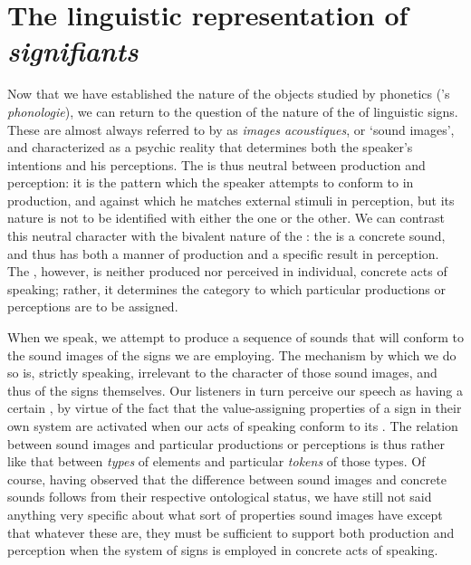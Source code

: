 \section{The linguistic representation of \textit{signifiants}}

Now that we have established the nature of the objects studied by
phonetics ({\Saussure}'s \emph{phonologie}), we can return to the
question of the nature of the \emph{} of linguistic
signs. These are almost always referred to by {\Saussure} as \emph{images
  acoustiques}, or `sound images', and characterized as a psychic
reality that determines both the speaker's intentions and his
perceptions. The  is thus neutral between production and
perception: it is the pattern which the speaker attempts to conform to
in production, and against which he matches external stimuli in
perception, but its nature is not to be identified with either the one
or the other. We can {contrast} this neutral character with the bivalent
nature of the : the  is a concrete sound, and thus has
both a manner of production and a specific result in perception. The
, however, is neither produced nor perceived in individual,
concrete acts of speaking; rather, it determines the category to which
particular productions or perceptions are to be assigned.

When we speak, we attempt to produce a sequence of sounds that will
conform to the sound images of the signs we are employing. The
{mechanism} by which we do so is, strictly speaking, irrelevant to the
character of those sound images, and thus of the signs themselves. Our
listeners in turn perceive our speech as having a certain , by
virtue of the fact that the value-assigning properties of a sign in
their own system are activated when our acts of speaking conform to
its . The relation between sound images and particular
productions or perceptions is thus rather like that between
\emph{types} of elements and particular \emph{tokens} of those
types. Of course, having observed that the difference between sound
images and concrete sounds follows from their respective ontological
status, we have still not said anything very specific about what sort
of properties sound images have except that whatever these are, they
must be sufficient to support both production and perception when the
system of signs is employed in concrete acts of speaking.

